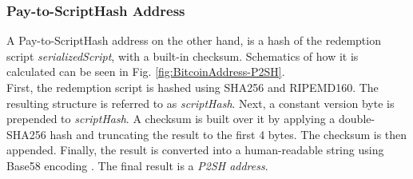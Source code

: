 \subsubsection{Pay-to-ScriptHash Address} \label{sec:Address-P2SH}
A Pay-to-ScriptHash address on the other hand, is a hash of the redemption script \textit{serializedScript}, with a built-in checksum. Schematics of how it is calculated can be seen in Fig. \ref{fig:BitcoinAddress-P2SH}.~\\

\noindent
First, the redemption script is hashed using SHA256 and RIPEMD160. The resulting structure is referred to as \textit{scriptHash}. Next, a constant version byte is prepended to \textit{scriptHash}. A checksum is built over it by applying a double-SHA256 hash and truncating the result to the first 4 bytes. The checksum is then appended. Finally, the result is converted into a human-readable string using Base58 encoding \cite{Base58}. The final result is a \emph{P2SH address}.

